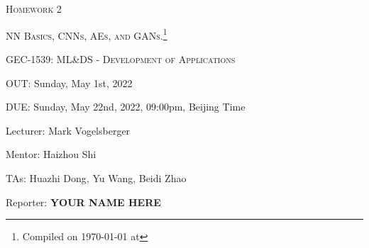 \documentclass[12pt,addpoints,answers]{exam}
\begin{document}
\section*{}
\begin{center}
  \centerline{\textsc{\LARGE  Homework 2}}
  \vspace{0.5em}
  \centerline{\textsc{\Large NN Basics, CNNs, AEs, and GANs.}\footnote{Compiled on \today{} at \currenttime{}}}
  \vspace{1.5em}
  \textsc{\large GEC-1539: ML\&DS - Development of Applications} \\
  \vspace{1.5em}
  \centerline{OUT: Sunday, May 1st, 2022}
  \centerline{DUE: Sunday, May 22nd, 2022, 09:00pm, Beijing Time}
  \vspace{0.5em}
    \centerline{Lecturer: Mark Vogelsberger}
    \centerline{Mentor: Haizhou Shi}
    \centerline{TAs: Huazhi Dong, Yu Wang, Beidi Zhao}
  \vspace{0.8em}    
    \centerline{Reporter: \textbf{YOUR NAME HERE}}
\end{center}



\clearpage

\clearpage

\clearpage


\clearpage
\end{document}
